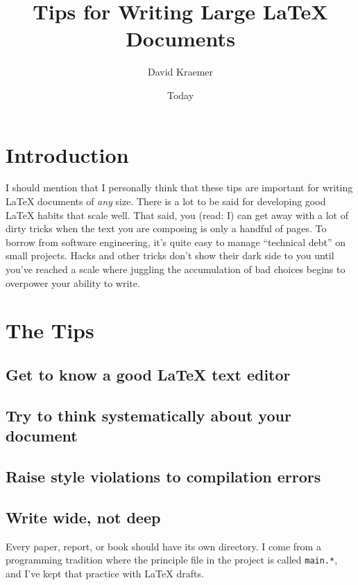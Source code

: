 \documentclass{article}
\title{Tips for Writing Large \LaTeX{} Documents}
\author{David Kraemer}
\date{Today}
\begin{document}
\maketitle

\section{Introduction} \label{sec:intro}

I should mention that I personally think that these tips are important for writing \LaTeX{} documents of \emph{any} size. There is a lot to be said for developing good \LaTeX{} habits that scale well. That said, you (read: I) can get away with a lot of dirty tricks when the text you are composing is only a handful of pages. To borrow from software engineering, it's quite easy to manage ``technical debt'' on small projects. Hacks and other tricks don't show their dark side to you until you've reached a scale where juggling the accumulation of bad choices begins to overpower your ability to write.

\section{The Tips} \label{sec:tips}

\subsection{Get to know a good \LaTeX{} text editor} \label{ssec:tips:text_editor}

\subsection{Try to think systematically about your document} \label{ssec:tips:systematic_thinking}

\subsection{Raise style violations to compilation errors} \label{ssec:tips:style_violations}

\subsection{Write wide, not deep} \label{ssec:tips:wide_vs_deep}

Every paper, report, or book should have its own directory. I come from a programming tradition where the principle file in the project is called \texttt{main.*}, and I've kept that practice with \LaTeX{} drafts.
\end{document}
